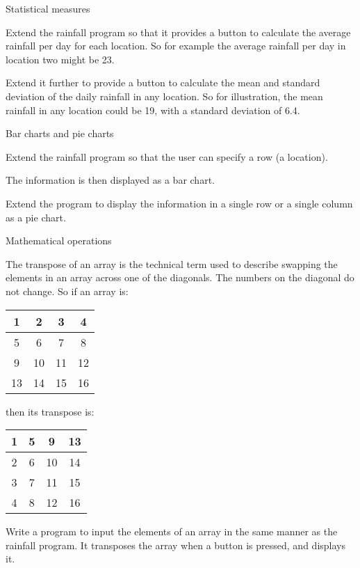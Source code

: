 		Statistical measures
		\begin{EXE}
			\item	Extend the rainfall program so that it provides a button to calculate the average rainfall per day for each location. So for example the average rainfall per day in location two might be 23.
				
			Extend it further to provide a button to calculate the mean and standard deviation of the daily rainfall in any location. So for illustration, the mean rainfall in any location could be 19, with a standard deviation of 6.4.
		\end{EXE}
			
		Bar charts and pie charts
		\begin{EXE}
		\item	Extend the rainfall program so that the user can specify a row (a location). 
				
			The information is then displayed as a bar chart.
				
			Extend the program to display the information in a single row or a single column as a pie chart.
		\end{EXE}
			
		Mathematical operations
		\begin{EXE}
			\item	{} The transpose of an array is the technical term used to describe swapping the elements in an array across one of the diagonals. The numbers on the diagonal do not change. So if an array is:
				\begin{center}
					\begin{tabular}{|c|c|c|c|}
						\hline
						1 & 2 & 3 & 4 \\ \hline
						5 & 6 & 7 & 8 \\ \hline
						9 & 10 & 11 & 12 \\ \hline
						13 & 14 & 15 & 16 \\ \hline
					\end{tabular}
				\end{center}

				then its transpose is:
				\begin{center}
					\begin{tabular}{|c|c|c|c|}
						\hline
						1 & 5 & 9 & 13 \\ \hline
						2 & 6 & 10 & 14 \\ \hline
						3 & 7 & 11 & 15 \\ \hline
						4 & 8 & 12 & 16\\ \hline
					\end{tabular}
				\end{center}

				Write a program to input the elements of an array in the same manner as the rainfall program. It transposes the array when a button is pressed, and displays it.
		\end{EXE}

